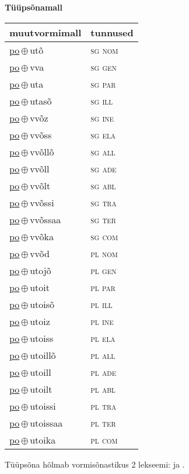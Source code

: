

\vspace{3.5em}
\noindent \begin{minipage}{\textwidth}
\noindent \textbf{Tüüpsõnamall \,}\\

\begin{sideways}
\begin{tabular}{l l}
muutvormimall & tunnused \\
\hline
\underline{po}\,$\oplus$\,utõ & \textsc{ sg nom } \\
\underline{po}\,$\oplus$\,vva & \textsc{ sg gen } \\
\underline{po}\,$\oplus$\,uta & \textsc{ sg par } \\
\underline{po}\,$\oplus$\,utasõ & \textsc{ sg ill } \\
\underline{po}\,$\oplus$\,vvõz & \textsc{ sg ine } \\
\underline{po}\,$\oplus$\,vvõss & \textsc{ sg ela } \\
\underline{po}\,$\oplus$\,vvõllõ & \textsc{ sg all } \\
\underline{po}\,$\oplus$\,vvõll & \textsc{ sg ade } \\
\underline{po}\,$\oplus$\,vvõlt & \textsc{ sg abl } \\
\underline{po}\,$\oplus$\,vvõssi & \textsc{ sg tra } \\
\underline{po}\,$\oplus$\,vvõssaa & \textsc{ sg ter } \\
\underline{po}\,$\oplus$\,vvõka & \textsc{ sg com } \\
\underline{po}\,$\oplus$\,vvõd & \textsc{ pl nom } \\
\underline{po}\,$\oplus$\,utojõ & \textsc{ pl gen } \\
\underline{po}\,$\oplus$\,utoit & \textsc{ pl par } \\
\underline{po}\,$\oplus$\,utoisõ & \textsc{ pl ill } \\
\underline{po}\,$\oplus$\,utoiz & \textsc{ pl ine } \\
\underline{po}\,$\oplus$\,utoiss & \textsc{ pl ela } \\
\underline{po}\,$\oplus$\,utoillõ & \textsc{ pl all } \\
\underline{po}\,$\oplus$\,utoill & \textsc{ pl ade } \\
\underline{po}\,$\oplus$\,utoilt & \textsc{ pl abl } \\
\underline{po}\,$\oplus$\,utoissi & \textsc{ pl tra } \\
\underline{po}\,$\oplus$\,utoissaa & \textsc{ pl ter } \\
\underline{po}\,$\oplus$\,utoika & \textsc{ pl com } \\
\end{tabular}
\end{sideways}
\label{tab:tüüpsõnamall-poutõ}

\end{minipage}

 
\vspace{1em}
\noindent Tüüpsõna hõlmab vormisõnastikus 2 lekseemi:  ja .

